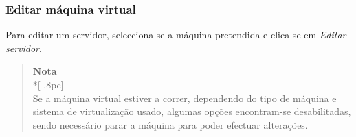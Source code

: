 \begin{description}
\end{description}

\subsubsection{Editar máquina virtual}
\label{sec:edit_server}
Para editar um servidor, selecciona-se a máquina pretendida e clica-se em \emph{Editar servidor}.

    \begin{quote}
        {\large \bf Nota} \\*[-.8pc]
        \underline{\hspace{6in}} \\
        Se a máquina virtual estiver a correr, dependendo do tipo de máquina e sistema de virtualização usado, algumas opções encontram-se desabilitadas, sendo necessário parar a máquina para poder efectuar alterações.
    \end{quote}

